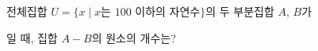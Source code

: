 전체집합 $U=\{x \mid x$는 $100$ 이하의 자연수$\}$의 두 부분집합 $A$, $B$가 \par\smallskip{}\par\smallskip{}\par\smallskip\noindent 일 때, 집합 $A-B$의 원소의 개수는?
